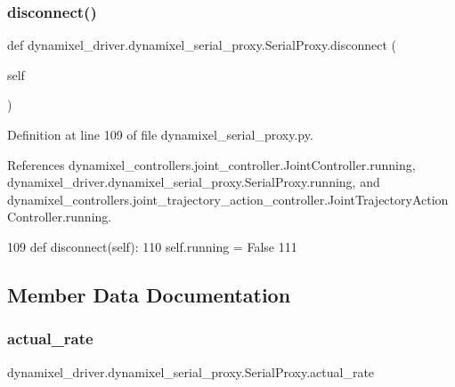 \subsubsection{\texorpdfstring{disconnect()}{disconnect()}}
{\footnotesize\ttfamily def dynamixel\+\_\+driver.\+dynamixel\+\_\+serial\+\_\+proxy.\+Serial\+Proxy.\+disconnect (\begin{DoxyParamCaption}\item[{}]{self }\end{DoxyParamCaption})}



Definition at line 109 of file dynamixel\+\_\+serial\+\_\+proxy.\+py.



References dynamixel\+\_\+controllers.\+joint\+\_\+controller.\+Joint\+Controller.\+running, dynamixel\+\_\+driver.\+dynamixel\+\_\+serial\+\_\+proxy.\+Serial\+Proxy.\+running, and dynamixel\+\_\+controllers.\+joint\+\_\+trajectory\+\_\+action\+\_\+controller.\+Joint\+Trajectory\+Action\+Controller.\+running.


\begin{DoxyCode}
109     \textcolor{keyword}{def }disconnect(self):
110         self.running = \textcolor{keyword}{False}
111 
\end{DoxyCode}


\subsection{Member Data Documentation}
\mbox{\label{classdynamixel__driver_1_1dynamixel__serial__proxy_1_1_serial_proxy_ae8a5c79c34050c536ec732d94f634035}} 
\subsubsection{\texorpdfstring{actual\+\_\+rate}{actual\_rate}}
{\footnotesize\ttfamily dynamixel\+\_\+driver.\+dynamixel\+\_\+serial\+\_\+proxy.\+Serial\+Proxy.\+actual\+\_\+rate}



